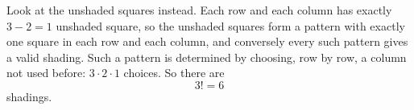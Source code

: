 Look at the unshaded squares instead. Each row and each column has exactly $3-2=1$ unshaded square, so the unshaded squares form a pattern with exactly one square in each row and each column, and conversely every such pattern gives a valid shading. Such a pattern is determined by choosing, row by row, a column not used before: $3\cdot2\cdot1$ choices. So there are
\[3!=\boxed{6}\]
shadings.
